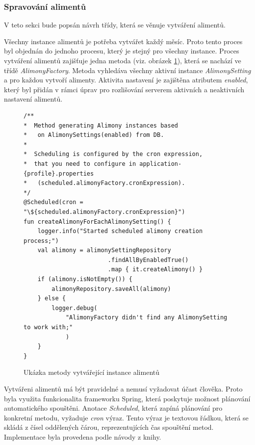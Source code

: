         \subsubsection{Spravování alimentů}
            V teto sekci bude popsán návrh třídy, která se věnuje vytváření alimentů.
        
            Všechny instance alimentů je potřeba vytvářet každý měsíc. Proto tento proces byl objednán do jednoho procesu, který je stejný pro všechny instance. Proces vytváření alimentů zajišťuje jedna metoda (viz. obrázek \ref{code:create-alimony}), která se nachází ve třídě \textit{AlimonyFactory}. Metoda vyhledáva všechny aktivní instance \textit{AlimonySetting} a pro každou vytvoří alimenty. Aktivita nastavení je zajištěna atributem \textit{enabled}, který byl přidán v rámci úprav pro rozlišování serverem aktivních a neaktivních nastavení alimentů.
            \begin{figure}
                \begin{verbatim}
/**
*  Method generating Alimony instances based 
*   on AlimonySettings(enabled) from DB.
*
*  Scheduling is configured by the cron expression,
*  that you need to configure in application-{profile}.properties 
*   (scheduled.alimonyFactory.cronExpression).
*/
@Scheduled(cron = "\${scheduled.alimonyFactory.cronExpression}")
fun createAlimonyForEachAlimonySetting() {
    logger.info("Started scheduled alimony creation process;")
    val alimony = alimonySettingRepository
                        .findAllByEnabledTrue()
                        .map { it.createAlimony() }
    if (alimony.isNotEmpty()) {
        alimonyRepository.saveAll(alimony)
    } else {
        logger.debug(
            "AlimonyFactory didn't find any AlimonySetting to work with;"
            )
    }
}
                \end{verbatim}
                \caption{Ukázka metody vytvářející instance alimentů} 
                \label{code:create-alimony}
            \end{figure}
            
            Vytvářeni alimentů má být pravidelné a nemusí vyžadovat účast člověka. Proto byla využita funkcionalita frameworku Spring, která poskytuje možnost plánování automatického spouštěni. \cite{spring-scheduling}Anotace \textit{Scheduled}, která zapíná plánování pro konkretní metodu, vyžaduje \textit{cron} výraz. Tento výraz je textovou řádkou, která se skládá z čísel oddělených čárou, reprezentujících čas spouštění metod\cite{cron-expression}. Implementace byla provedena podle návody z knihy\cite{sbr:spring-task-scheduling}.
            

